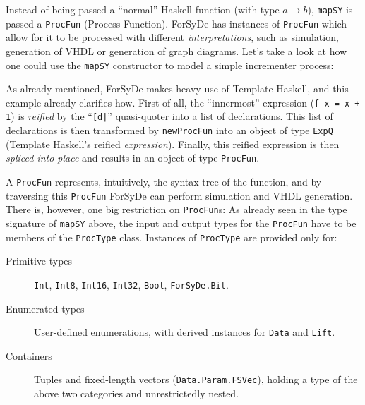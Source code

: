             Instead of being passed a ``normal'' Haskell function (with type $a → b$),
            \texttt{mapSY} is passed a \texttt{ProcFun} (Process Function). ForSyDe has instances of
            \texttt{ProcFun} which allow for it to be processed with different
            \emph{interpretations}, such as simulation, generation of VHDL or generation of graph
            diagrams. Let's take a look at how one could use the \texttt{mapSY} constructor to model
            a simple incrementer process:


            As already mentioned, ForSyDe makes heavy use of Template Haskell, and this example
            already clarifies how. First of all, the ``innermost'' expression (\verb;f x = x + 1;)
            is \emph{reified} by the ``\texttt{[d|}'' quasi-quoter into a list of declarations. This
            list of declarations is then transformed by \texttt{newProcFun} into an object of type
            \texttt{ExpQ} (Template Haskell's reified \emph{expression}). Finally, this reified
            expression is then \emph{spliced into place} and results in an object of type
            \texttt{ProcFun}.

            A \texttt{ProcFun} represents, intuitively, the syntax tree of the function, and by
            traversing this \texttt{ProcFun} ForSyDe can perform simulation and VHDL generation.
            There is, however, one big restriction on \texttt{ProcFun}s: As already seen in the type
            signature of \texttt{mapSY} above, the input and output types for the \texttt{ProcFun}
            have to be members of the \texttt{ProcType} class. Instances of \texttt{ProcType} are
            provided only for:

            \begin{description}
                \item[Primitive types] \texttt{Int}, \texttt{Int8}, \texttt{Int16},
                    \texttt{Int32}, \texttt{Bool}, \texttt{ForSyDe.Bit}.

                \item[Enumerated types] User-defined enumerations, with derived instances for
                    \texttt{Data} and \texttt{Lift}.

                \item[Containers] Tuples and fixed-length vectors (\texttt{Data.Param.FSVec}),
                    holding a type of the above two categories and unrestrictedly nested.
            \end{description}

